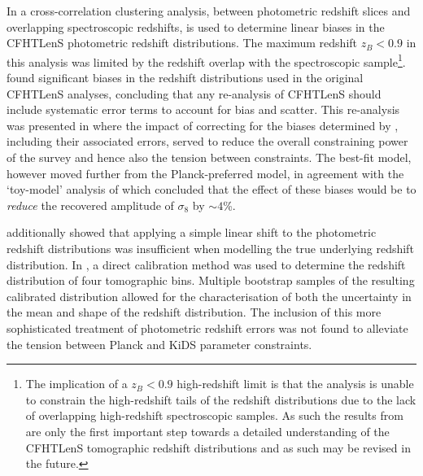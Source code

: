 In \citet{choi/etal:2016} a cross-correlation clustering analysis, between photometric redshift slices and overlapping spectroscopic redshifts, is used to determine linear biases in the CFHTLenS photometric redshift distributions.   The maximum redshift $z_B<0.9$ in this analysis was limited by the redshift overlap with the spectroscopic sample\footnote{The implication of a $z_B < 0.9$ high-redshift limit is that the analysis is unable to constrain the high-redshift tails of the redshift distributions due to the lack of overlapping high-redshift spectroscopic samples. As such the results from \citet{choi/etal:2016} are only the first important step towards a detailed understanding of the CFHTLenS tomographic redshift distributions and as such may be revised in the future.}.  \citet{choi/etal:2016} found significant biases in the redshift distributions used in the original CFHTLenS analyses,
concluding that any re-analysis of CFHTLenS should include systematic error terms to account for bias and scatter.    This re-analysis was presented in \citet{joudaki/etal:2016} where the impact of correcting for the biases determined by \citet{choi/etal:2016}, including their associated errors, served to reduce the overall constraining power of the survey and hence also the tension between constraints.  The best-fit model, however moved further from the Planck-preferred model, in agreement with the `toy-model' analysis of \citet{choi/etal:2016} which concluded that the effect of these biases would be to {\it reduce} the recovered amplitude of $\sigma_8$ by $\sim 4$\%. 

\citet{choi/etal:2016} additionally showed that applying a simple linear shift to the photometric redshift distributions was insufficient when modelling the true underlying redshift distribution.  In \citet{hildebrandt/etal:2016}, a direct calibration method was used to determine the redshift distribution of four tomographic bins.  Multiple bootstrap samples of the resulting calibrated distribution allowed for the characterisation of both the uncertainty in the mean and shape of the redshift distribution.  The inclusion of this more sophisticated treatment of photometric redshift errors was not found to alleviate the tension between Planck and KiDS parameter constraints.

